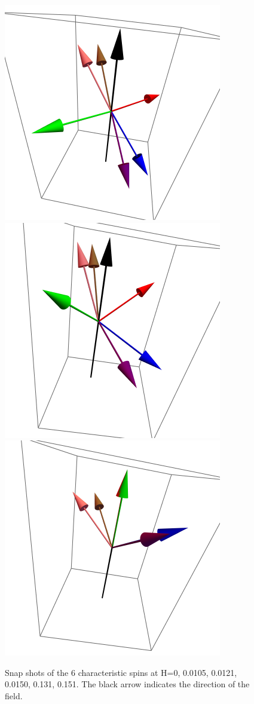 \begin{figure}[ht]
\includegraphics[scale=0.3]{25june16/HVariedData/Pictures/001Inc151.png}
\includegraphics[scale=0.3]{25june16/HVariedData/Pictures/001Inc30S.png}
\includegraphics[scale=0.3]{25june16/HVariedData/Pictures/001Inc35S.png}
\label{fig:001vecs}
\caption{Snap shots of the 6 characteristic spins at H=0, 0.0105, 0.0121, 0.0150, 0.131, 0.151. The black arrow
indicates the direction of the field.}
\end{figure}
\clearpage

